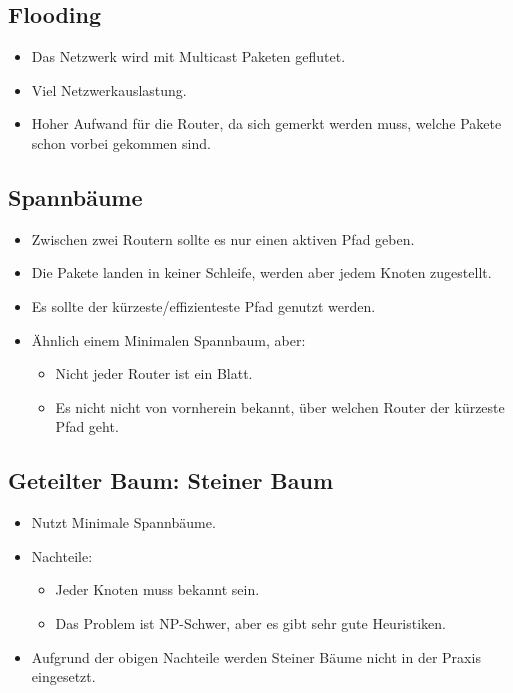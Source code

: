 \documentclass[a4paper, 11pt, accentcolor = tud3b]{tudreport}
\begin{document}
            \subsection{Flooding}
				\begin{itemize}
					\item Das Netzwerk wird mit Multicast Paketen geflutet.
					\item Viel Netzwerkauslastung.
					\item Hoher Aufwand für die Router, da sich gemerkt werden muss, welche Pakete schon vorbei gekommen sind.
				\end{itemize}

            \subsection{Spannbäume}
                \begin{itemize}
                	\item Zwischen zwei Routern sollte es nur einen aktiven Pfad geben.
                	\item Die Pakete landen in keiner Schleife, werden aber jedem Knoten zugestellt.
                	\item Es sollte der kürzeste/effizienteste Pfad genutzt werden.
                	\item Ähnlich einem Minimalen Spannbaum, aber:
	                	\begin{itemize}
	                		\item Nicht jeder Router ist ein Blatt.
	                		\item Es nicht nicht von vornherein bekannt, über welchen Router der kürzeste Pfad geht.
	                	\end{itemize}
                \end{itemize}

            \subsection{Geteilter Baum: Steiner Baum}
                \begin{itemize}
                	\item Nutzt Minimale Spannbäume.
                	\item Nachteile:
	                	\begin{itemize}
	                		\item Jeder Knoten muss bekannt sein.
	                		\item Das Problem ist NP-Schwer, aber es gibt sehr gute Heuristiken.
	                	\end{itemize}
                	\item Aufgrund der obigen Nachteile werden Steiner Bäume nicht in der Praxis eingesetzt.
                \end{itemize}
\end{document}
